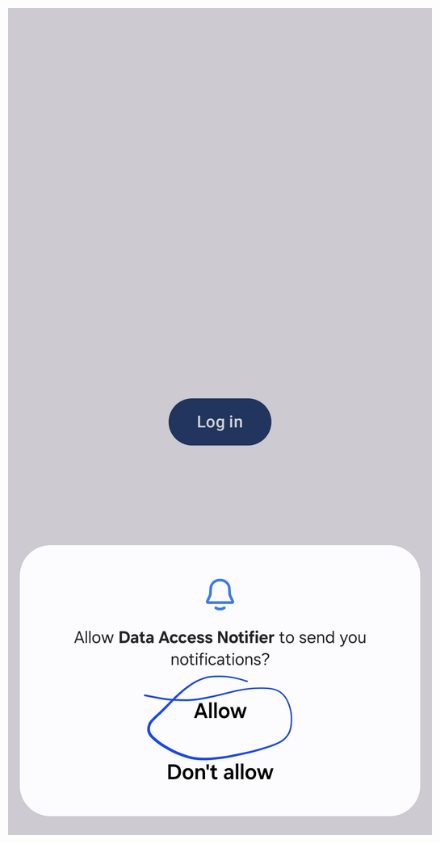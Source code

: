 \begin{figure}[H]
\begin{minipage}{0.32\textwidth}
    \centering
    \includegraphics[width=\textwidth]{english/figures/Screenshot_20250812_212153_Permission controller.jpg}
\end{minipage}%
\hfill
\begin{minipage}{0.32\textwidth}
    \centering

\end{minipage}
\end{figure}
